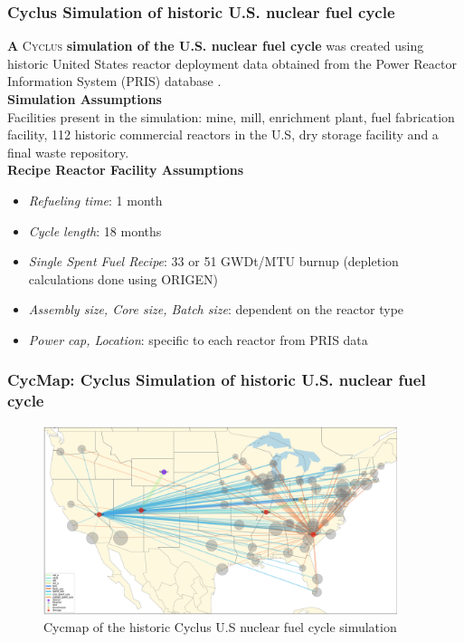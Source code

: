 
\begin{frame}
    \frametitle{Cyclus Simulation of historic U.S. nuclear fuel cycle}
    \textbf{A} \textsc{Cyclus} \textbf{simulation of the U.S. nuclear fuel cycle} was created using historic United States reactor deployment data obtained from the Power Reactor Information System (PRIS) database \cite{peterson_unf_2017}.
    \\

    \textbf{Simulation Assumptions} \\
    Facilities present in the simulation: mine, mill, enrichment plant, fuel fabrication facility, 112 historic commercial reactors in the U.S, dry storage facility and a final waste repository.
    \\

    \textbf{Recipe Reactor Facility Assumptions}
    \begin{itemize}
    \item \textit{Refueling time}: 1 month
    \item \textit{Cycle length}: 18 months
    \item \textit{Single Spent Fuel Recipe}: 33 or 51 GWDt/MTU burnup (depletion calculations done using ORIGEN)
    \item \textit{Assembly size, Core size, Batch size}: dependent on the reactor type
    \item \textit{Power cap, Location}: specific to each reactor from PRIS data
    \end{itemize}
  \end{frame}

  \begin{frame}
    \frametitle{CycMap: Cyclus Simulation of historic U.S. nuclear fuel cycle}
    \begin{figure}[htbp!]
      \begin{center}
        \includegraphics[height=5.5cm]{images/cycmap}
      \end{center}
            \caption{Cycmap of the historic Cyclus U.S nuclear fuel cycle simulation \cite{park_arfc/cycmap_2018}}
    \end{figure}
  \end{frame}

